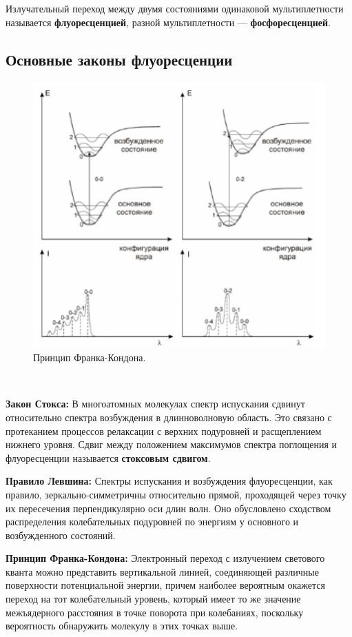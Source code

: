 \documentclass{article}
\begin{document}
Излучательный переход между двумя состояниями одинаковой мультиплетности
называется \textbf{флуоресценцией}, разной мультиплетности — \textbf{фосфоресценцией}.
\subsection{Основные законы флуоресценции}
\begin{figure}
    \includegraphics[width=\linewidth]{Images/Франк-Кондон.png}
    \caption{Принцип Франка-Кондона.}
\end{figure}\
\par \textbf{Закон Стокса:}
В многоатомных молекулах спектр испускания сдвинут относительно спектра
возбуждения в длинноволновую область. Это связано с протеканием процессов
релаксации с верхних подуровней и расщеплением нижнего уровня. Сдвиг между
положением максимумов спектра поглощения и флуоресценции называется \textbf{стоксовым
сдвигом}.

\textbf{Правило Левшина:} Спектры
испускания и возбуждения флуоресценции, как правило, зеркально-симметричны относительно прямой, проходящей через точку их пересечения перпендикулярно оси длин волн. Оно обусловлено сходством распределения колебательных подуровней по энергиям у основного и возбужденного состояний. 

\textbf{Принцип Франка-Кондона:} Электронный переход с излучением светового кванта можно представить вертикальной
линией, соединяющей различные поверхности
потенциальной энергии, причем наиболее вероятным окажется переход на тот колебательный уровень, который имеет то же значение межъядерного расстояния в точке поворота при колебаниях, поскольку вероятность обнаружить молекулу в этих точках выше.
\end{document}
